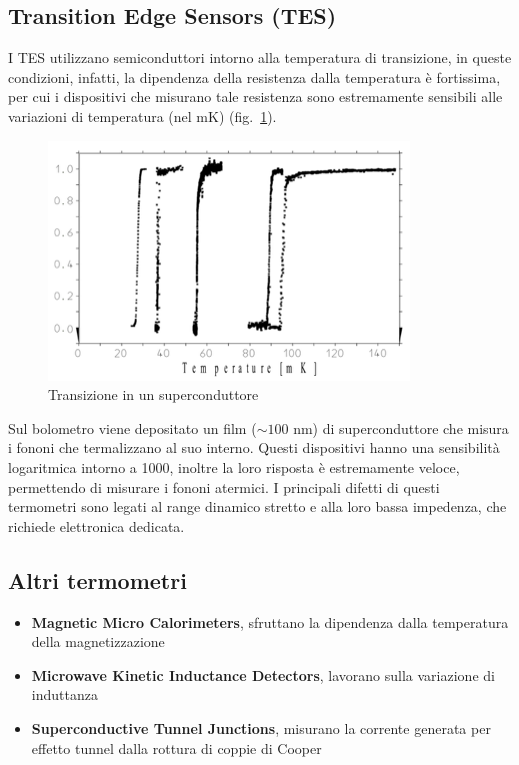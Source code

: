 \subsection{Transition Edge Sensors (TES)}
I TES utilizzano semiconduttori intorno alla temperatura di transizione, in queste condizioni, infatti, la dipendenza della resistenza dalla temperatura \`e fortissima,
per cui i dispositivi che misurano tale resistenza sono estremamente sensibili alle variazioni di temperatura (nel mK) (fig.~\ref{fig:TES}).
\begin{figure}[htbp]
\begin{center}
\includegraphics[scale=1]{./Immagini/TES.png}
\caption{Transizione in un superconduttore}
\label{fig:TES}
\end{center}
\end{figure}
Sul bolometro viene depositato un film ($\sim 100$ nm) di superconduttore che misura i fononi che termalizzano al suo interno.
Questi dispositivi hanno una sensibilit\`a logaritmica intorno a 1000, inoltre la loro risposta \`e estremamente veloce, permettendo di
misurare i fononi atermici.
I principali difetti di questi termometri sono legati al range dinamico stretto e alla loro bassa impedenza, che richiede elettronica
dedicata.
\subsection{Altri termometri}
\begin{itemize}
\item \textbf{Magnetic Micro Calorimeters}, sfruttano la dipendenza dalla temperatura della magnetizzazione
\item \textbf{Microwave Kinetic Inductance Detectors}, lavorano sulla variazione di induttanza
\item \textbf{Superconductive Tunnel Junctions}, misurano la corrente generata per effetto tunnel dalla rottura di coppie di Cooper
\end{itemize}
